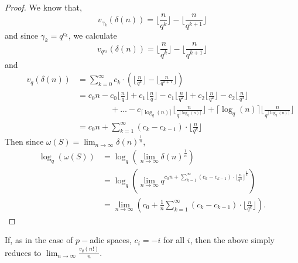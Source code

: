 \begin{proof}
	We know that,
\[v_{\gamma_k}(\delta(n)) =  \lfloor\frac{n}{q^k}\rfloor - \lfloor\frac{n}{q^{k+1}}\rfloor \]
and since $\gamma_k = q^{c_k}$, we calculate
\[v_{q^{c_k}}(\delta(n)) =  \lfloor\frac{n}{q^k}\rfloor - \lfloor\frac{n}{q^{k+1}}\rfloor \]
and
\begin{align*}
\qquad v_{q}(\delta(n)) &=  \sum_{k=0}^{\infty} c_k \cdot(\lfloor\frac{n}{q^k}\rfloor - \lfloor\frac{n}{q^{k+1}}\rfloor) \\
&=  c_0n - c_0\lfloor\frac{n}{q}\rfloor + c_1\lfloor\frac{n}{q}\rfloor - c_1\lfloor\frac{n}{q^{2}}\rfloor  + c_2\lfloor\frac{n}{q^2}\rfloor - c_2\lfloor\frac{n}{q^{3}}\rfloor \\
&\qquad \qquad + \ldots - c_{\lceil \log_q(n) \rceil} \lfloor\frac{n}{q^{\lceil \log_q(n) \rceil}}\rfloor + \lceil \log_q(n) \rceil\lfloor\frac{n}{q^{\lceil \log_q(n) \rceil}}\rfloor \\ 
&=  c_0n + \sum_{k=1}^{\infty} (c_{k} - c_{k-1}) \cdot \lfloor\frac{n}{q^{k}}\rfloor
\end{align*}
Then since $\omega(S) = \lim_{n\to\infty} \delta(n) ^{\frac{1}{n}	}$,
\begin{align*}
\log_q(\omega(S)) &= \log_q(\lim_{n\to\infty} \delta(n) ^{\frac{1}{n}}) \\
&= \log_q(\lim_{n\to\infty}q^{{c_0n + \sum_{k=1}^{\infty} (c_{k} - c_{k-1}) \cdot \lfloor\frac{n}{q^{k}}\rfloor}^{\frac{1}{n}}})\\
&=\lim_{n\to\infty} (c_0 + \frac{1}{n}\sum_{k=1}^{\infty} (c_{k} - c_{k-1}) \cdot \lfloor\frac{n}{q^{k}}\rfloor). 
\end{align*}
\end{proof}

If, as in the case of $p-$adic spaces, $c_i=-i$ for all $i$, then the above simply reduces to $\lim_{n\to\infty} \frac{v_q(n!)}{n}$.\\ %

